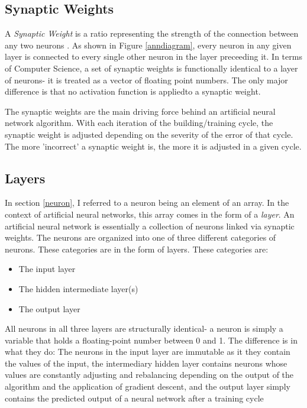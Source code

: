 \documentclass[12pt]{article}
\begin{document}
\subsection{Synaptic Weights \label{weights}}

A \textit{Synaptic Weight} is a ratio representing the strength of the connection between any two neurons \textcite{shamdasani2017}. As shown in Figure \ref{anndiagram}, every neuron in any given layer is connected to every single other neuron in  the layer preceeding it. In terms of Computer Science, a set of synaptic weights is functionally identical to a layer of neurons- it is treated as a vector of floating point numbers. The only major difference is that no activation function is appliedto a synaptic weight.

The synaptic weights are the main driving force behind an artificial neural network algorithm. With each iteration of the building/training cycle, the synaptic weight is adjusted depending on the severity of the error of that cycle. The more 'incorrect' a synaptic weight is, the more it is adjusted in a given cycle.

\subsection{Layers}

In section \ref{neuron}, I referred to a neuron being an element of an array. In the context of artificial neural networks, this array comes in the form of a \textit{layer}. An artificial neural network is essentially a collection of neurons linked via synaptic weights. The neurons are organized into one of three different categories of neurons. These categories are in the form of layers. These categories are:

\begin{itemize}
    \item The input layer
    \item The hidden intermediate layer(s)
    \item The output layer
\end{itemize}

All neurons in all three layers are structurally identical- a neuron is simply a variable that holds a floating-point number between 0 and 1. The difference is in what they do: The neurons in the input layer are immutable as it they contain the values of the input, the intermediary hidden layer contains neurons whose values are constantly adjusting and rebalancing depending on the output of the algorithm and the application of gradient descent, and the output layer simply contains the predicted output of a neural network after a training cycle
\end{document}
